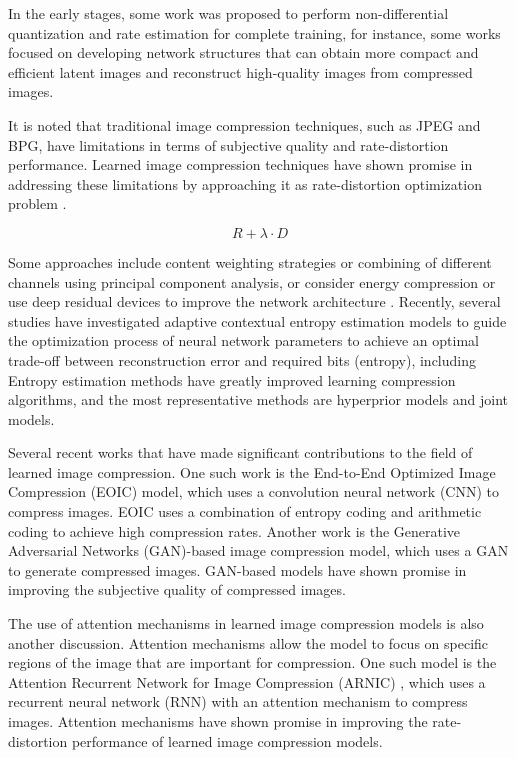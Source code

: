 \documentclass{article}
\begin{document}
In the early stages, some work was proposed to perform non-differential quantization and rate estimation for complete training, for instance, some works focused on developing network structures that can obtain more compact and efficient latent images and reconstruct high-quality images from compressed images. 

It is noted that traditional image compression techniques, such as JPEG and BPG, have limitations in terms of subjective quality and rate-distortion performance. Learned image compression techniques have shown promise in addressing these limitations by approaching it as rate-distortion optimization problem \cite{ELIC}.

\begin{equation}
    R + \lambda \cdot D
\end{equation}

Some approaches include content weighting strategies or combining of different channels using principal component analysis, or consider energy compression or use deep residual devices to improve the network architecture \cite{balle2016}. Recently, several studies have investigated adaptive contextual entropy estimation models to guide the optimization process of neural network parameters to achieve an optimal trade-off between reconstruction error and required bits (entropy), including \cite{AgustssonEirikur2017SVQf, balle2018, mbt2018, LeeJooyoung2019CEMf} Entropy estimation methods have greatly improved learning compression algorithms, and the most representative methods are hyperprior models and joint models.


Several recent works that have made significant contributions to the field of learned image compression. One such work is the \cite{VincentPascal2008Eacr, TheisLucas2017Licw, balle2016} End-to-End Optimized Image Compression (EOIC) model, which uses a convolution neural network (CNN) to compress images. EOIC uses a combination of entropy coding and arithmetic coding to achieve high compression rates. Another work is the Generative Adversarial Networks (GAN)-based image compression model, which uses a GAN to generate compressed images. GAN-based models have shown promise in improving the subjective quality of compressed images.

The use of attention mechanisms in learned image compression models is also another discussion. Attention mechanisms allow the model to focus on specific regions of the image that are important for compression. One such model is the Attention Recurrent Network for Image Compression (ARNIC) \cite{XueYuyang2019ABIC}, which uses a recurrent neural network (RNN) with an attention mechanism to compress images. Attention mechanisms have shown promise in improving the rate-distortion performance of learned image compression models.
\end{document}
